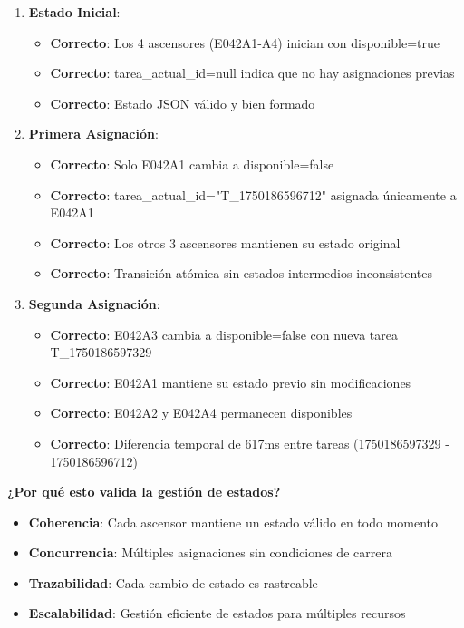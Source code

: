 \begin{enumerate}
    \item \textbf{Estado Inicial}:
    \begin{itemize}
        \item \textcolor{successgreen}{\textbf{Correcto}}: Los 4 ascensores (E042A1-A4) inician con disponible=true
        \item \textcolor{successgreen}{\textbf{Correcto}}: tarea\_actual\_id=null indica que no hay asignaciones previas
        \item \textcolor{successgreen}{\textbf{Correcto}}: Estado JSON válido y bien formado
    \end{itemize}
    
    \item \textbf{Primera Asignación}:
    \begin{itemize}
        \item \textcolor{successgreen}{\textbf{Correcto}}: Solo E042A1 cambia a disponible=false
        \item \textcolor{successgreen}{\textbf{Correcto}}: tarea\_actual\_id="T\_1750186596712" asignada únicamente a E042A1
        \item \textcolor{successgreen}{\textbf{Correcto}}: Los otros 3 ascensores mantienen su estado original
        \item \textcolor{successgreen}{\textbf{Correcto}}: Transición atómica sin estados intermedios inconsistentes
    \end{itemize}
    
    \item \textbf{Segunda Asignación}:
    \begin{itemize}
        \item \textcolor{successgreen}{\textbf{Correcto}}: E042A3 cambia a disponible=false con nueva tarea T\_1750186597329
        \item \textcolor{successgreen}{\textbf{Correcto}}: E042A1 mantiene su estado previo sin modificaciones
        \item \textcolor{successgreen}{\textbf{Correcto}}: E042A2 y E042A4 permanecen disponibles
        \item \textcolor{successgreen}{\textbf{Correcto}}: Diferencia temporal de 617ms entre tareas (1750186597329 - 1750186596712)
    \end{itemize}
\end{enumerate}

\textbf{¿Por qué esto valida la gestión de estados?}
\begin{itemize}
    \item \textbf{Coherencia}: Cada ascensor mantiene un estado válido en todo momento
    \item \textbf{Concurrencia}: Múltiples asignaciones sin condiciones de carrera
    \item \textbf{Trazabilidad}: Cada cambio de estado es rastreable
    \item \textbf{Escalabilidad}: Gestión eficiente de estados para múltiples recursos
\end{itemize}


